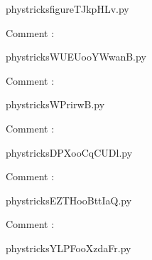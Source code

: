     \newcommand{\CaptionFigfigureTJkpHLv}{<+Type your caption here+>}
    \begin{center}
        
    \end{center}
    phystricksfigureTJkpHLv.py

    Comment : 

    \clearpage
    


    \newcommand{\CaptionFigWUEUooYWwanB}{<+Type your caption here+>}
    \begin{center}
        
    \end{center}
    phystricksWUEUooYWwanB.py

    Comment : 

    \clearpage
    


    \newcommand{\CaptionFigWPrirwB}{<+Type your caption here+>}
    \begin{center}
        
    \end{center}
    phystricksWPrirwB.py

    Comment : 

    \clearpage
    


    \newcommand{\CaptionFigDPXooCqCUDl}{<+Type your caption here+>}
    \begin{center}
        
    \end{center}
    phystricksDPXooCqCUDl.py

    Comment : 

    \clearpage
    


    \newcommand{\CaptionFigEZTHooBttIaQ}{<+Type your caption here+>}
    \begin{center}
        
    \end{center}
    phystricksEZTHooBttIaQ.py

    Comment : 

    \clearpage
    


    \newcommand{\CaptionFigYLPFooXzdaFr}{<+Type your caption here+>}
    \begin{center}
        
    \end{center}
    phystricksYLPFooXzdaFr.py

